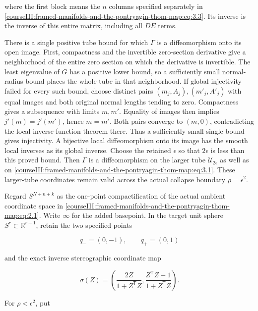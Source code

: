where the first block means the \(n\) columns specified separately in \eqref{courseIII:framed-manifolds-and-the-pontryagin-thom-map:eq:3.3}. Its inverse is the inverse of this entire matrix, including all \(DE\) terms.

There is a single positive tube bound for which \(\Gamma\) is a diffeomorphism onto its open image. First, compactness and the invertible zero-section derivative give a neighborhood of the entire zero section on which the derivative is invertible. The least eigenvalue of \(G\) has a positive lower bound, so a sufficiently small normal-radius bound places the whole tube in that neighborhood. If global injectivity failed for every such bound, choose distinct pairs \((m_j,A_j),(m'_j,A'_j)\) with equal images and both original normal lengths tending to zero. Compactness gives a subsequence with limits \(m,m'\). Equality of images then implies \(j'(m)=j'(m')\), hence \(m=m'\). Both pairs converge to \((m,0)\), contradicting the local inverse-function theorem there. Thus a sufficiently small single bound gives injectivity. A bijective local diffeomorphism onto its image has the smooth local inverses as its global inverse. Choose the retained \(\epsilon\) so that \(2\epsilon\) is less than this proved bound. Then \(\Gamma\) is a diffeomorphism on the larger tube \(\mathcal U_{2\epsilon}\) as well as on \eqref{courseIII:framed-manifolds-and-the-pontryagin-thom-map:eq:3.1}. These larger-tube coordinates remain valid across the actual collapse boundary \(\rho=\epsilon^2\).

Regard \(S^{N+n+k}\) as the one-point compactification of the actual ambient coordinate space in \eqref{courseIII:framed-manifolds-and-the-pontryagin-thom-map:eq:2.1}. Write \(\infty\) for the added basepoint. In the target unit sphere \(S^r\subset\mathbb R^{r+1}\), retain the two specified points

\begin{equation}
q_-=(0,-1),\qquad q_+=(0,1)
 \label{courseIII:framed-manifolds-and-the-pontryagin-thom-map:eq:3.6}
\end{equation}

and the exact inverse stereographic coordinate map

\begin{equation}
\sigma(Z)=
 \left(\frac{2Z}{1+Z^{\mathsf T}Z},
       \frac{Z^{\mathsf T}Z-1}{1+Z^{\mathsf T}Z}\right).
 \label{courseIII:framed-manifolds-and-the-pontryagin-thom-map:eq:3.7}
\end{equation}

For \(\rho<\epsilon^2\), put

